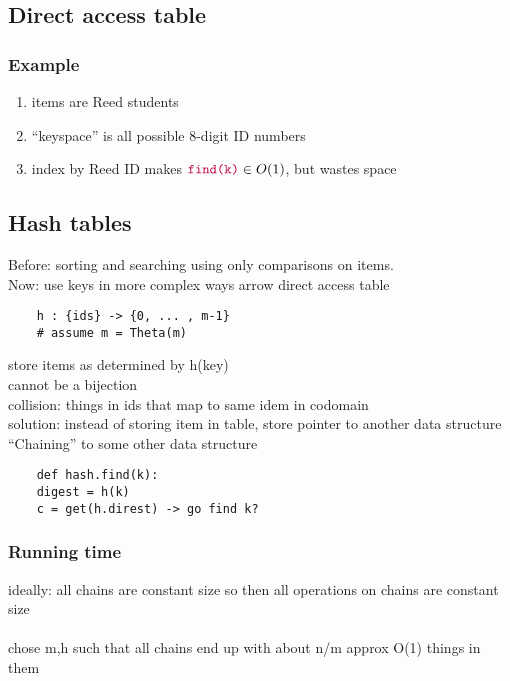 \documentclass{article}
\begin{document}
    \subsection{Direct access table}
        \subsubsection{Example}
        \begin{enumerate}
            \item items are Reed students
            \item ``keyspace'' is all possible 8-digit ID numbers
            \item index by Reed ID makes $\texttt{\textcolor{purple}{find(k)}} \in O(1)$, but wastes space
        \end{enumerate}

    \subsection{Hash tables}
Before: sorting and searching using only comparisons on items.\\
Now: use keys in more complex ways arrow direct access table\\

\begin{verbatim}
    h : {ids} -> {0, ... , m-1}
    # assume m = Theta(m)
\end{verbatim}
store items as determined by h(key)\\
cannot be a bijection\\
collision: things in ids that map to same idem in codomain\\
solution: instead of storing item in table, store pointer to another data structure\\
``Chaining'' to some other data structure\\
\begin{verbatim}
    def hash.find(k):
    digest = h(k)
    c = get(h.direst) -> go find k?
\end{verbatim}
\subsubsection{Running time }
ideally: all chains are constant size so then all operations on chains are constant size\\
\\
chose m,h such that all chains end up with about n/m approx O(1) things in them\\
\end{document}
